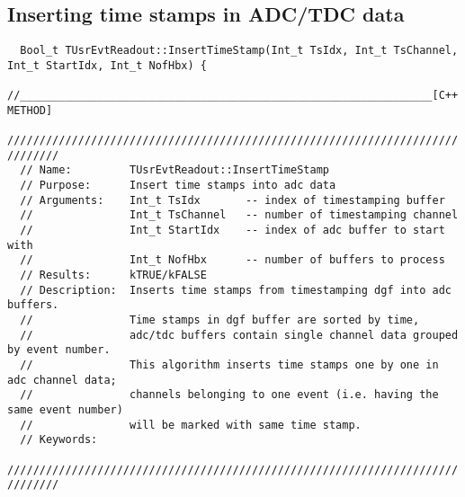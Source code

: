 \documentclass[10pt]{article}
\newenvironment{yellowboxed}
	{\begin{Sbox}\begin{minipage}[t]}
	{\end{minipage}\end{Sbox}\colorbox{yellow}{\TheSbox}}
\begin{document}
\subsection{Inserting time stamps in ADC/TDC data}\label{InsertingTimeStamps}
\begin{center}
\begin{table}[H]
{\scriptsize
\begin{yellowboxed}{\linewidth}
\verb+  Bool_t TUsrEvtReadout::InsertTimeStamp(Int_t TsIdx, Int_t TsChannel, Int_t StartIdx, Int_t NofHbx) {+\\
\verb-  //________________________________________________________________[C++ METHOD]-\\
\verb+  //////////////////////////////////////////////////////////////////////////////+\\
\verb+  // Name:         TUsrEvtReadout::InsertTimeStamp+\\
\verb+  // Purpose:      Insert time stamps into adc data+\\
\verb+  // Arguments:    Int_t TsIdx       -- index of timestamping buffer+\\
\verb+  //               Int_t TsChannel   -- number of timestamping channel+\\
\verb+  //               Int_t StartIdx    -- index of adc buffer to start with+\\
\verb+  //               Int_t NofHbx      -- number of buffers to process+\\
\verb+  // Results:      kTRUE/kFALSE+\\
\verb+  // Description:  Inserts time stamps from timestamping dgf into adc buffers.+\\
\verb+  //               Time stamps in dgf buffer are sorted by time,+\\
\verb+  //               adc/tdc buffers contain single channel data grouped by event number.+\\
\verb+  //               This algorithm inserts time stamps one by one in adc channel data;+\\
\verb+  //               channels belonging to one event (i.e. having the same event number)+\\
\verb+  //               will be marked with same time stamp.+\\
\verb+  // Keywords:     +\\
\verb+  //////////////////////////////////////////////////////////////////////////////+\\
\verb+  +\\

\end{yellowboxed}}
\end{table}
\end{center}
\end{document}
